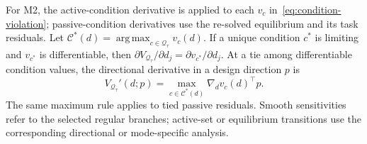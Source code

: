 For M2, the active-condition derivative is applied to each $v_c$ in~\eqref{eq:condition-violation}; passive-condition derivatives use the re-solved equilibrium and its task residuals. Let $\mathcal C^*(d)=\operatorname*{arg\,max}_{c\in\mathcal Q_\tau}v_c(d)$. If a unique condition $c^*$ is limiting and $v_{c^*}$ is differentiable, then $\partial V_{\mathcal Q_\tau}/\partial d_j=\partial v_{c^*}/\partial d_j$. At a tie among differentiable condition values, the directional derivative in a design direction $p$ is
\begin{equation}
V_{\mathcal Q_\tau}'(d;p)
=\max_{c\in\mathcal C^*(d)}\nabla_d v_c(d)^\top p.
\label{eq:condition-directional-sensitivity}
\end{equation}
The same maximum rule applies to tied passive residuals. Smooth sensitivities refer to the selected regular branches; active-set or equilibrium transitions use the corresponding directional or mode-specific analysis.
